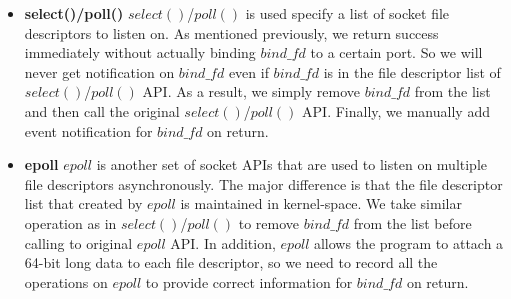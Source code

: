 \begin{itemize}
\item {\bf select()/poll()} $select()$/$poll()$ is used specify a list of socket file descriptors to listen on. As mentioned previously, we return success immediately without actually binding $bind\_fd$ to a certain port. So we will never get notification on $bind\_fd$ even if $bind\_fd$ is in the file descriptor list of $select()$/$poll()$ API. As a result, we simply remove $bind\_fd$ from the list and then call the original $select()$/$poll()$ API. Finally, we manually add event notification for $bind\_fd$ on return.

\item {\bf epoll} $epoll$ is another set of socket APIs that are used to listen on multiple file descriptors asynchronously. The major difference is that the file descriptor list that created by $epoll$ is maintained in kernel-space. We take similar operation as in $select()$/$poll()$ to remove $bind\_fd$ from the list before calling to original $epoll$ API. In addition, $epoll$ allows the program to attach a 64-bit long data to each file descriptor, so we need to record all the operations on $epoll$ to provide correct information for $bind\_fd$ on return.

\end{itemize}
